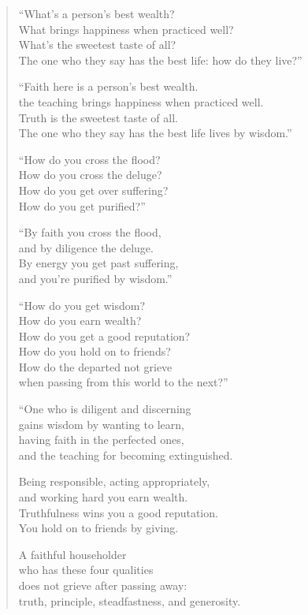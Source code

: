 \documentclass[12pt,openany]{book}%
\begin{document}
\begin{verse}%
“What’s a person’s best wealth? \\
What brings happiness when practiced well? \\
What’s the sweetest taste of all? \\
The one who they say has the best life: how do they live?” 

“Faith here is a person’s best wealth. \\
the teaching brings happiness when practiced well. \\
Truth is the sweetest taste of all. \\
The one who they say has the best life lives by wisdom.” 

“How do you cross the flood? \\
How do you cross the deluge? \\
How do you get over suffering? \\
How do you get purified?” 

“By faith you cross the flood, \\
and by diligence the deluge. \\
By energy you get past suffering, \\
and you’re purified by wisdom.” 

“How do you get wisdom? \\
How do you earn wealth? \\
How do you get a good reputation? \\
How do you hold on to friends? \\
How do the departed not grieve \\
when passing from this world to the next?” 

“One who is diligent and discerning \\
gains wisdom by wanting to learn, \\
having faith in the perfected ones, \\
and the teaching for becoming extinguished. 

Being responsible, acting appropriately, \\
and working hard you earn wealth. \\
Truthfulness wins you a good reputation. \\
You hold on to friends by giving. 

A faithful householder \\
who has these four qualities \\
does not grieve after passing away: \\
truth, principle, steadfastness, and generosity. 


\end{verse}
\end{document}
